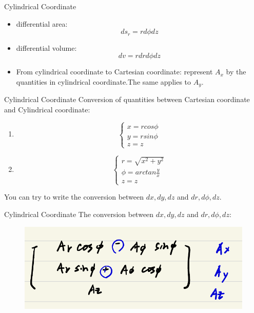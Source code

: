 \documentclass[xcolor={dvipsnames}]{beamer}
\begin{document}
\begin{frame}{Cylindrical Coordinate}
\begin{itemize}
    \item differential area: 
    $$
    ds_r = rd\phi dz
    $$

    \item differential volume:
    $$
    dv = rdrd\phi dz
    $$
    \item From cylindrical coordinate to Cartesian coordinate: represent $A_x$ by the quantities in cylindrical coordinate.The same applies to $A_y$.

\end{itemize}
\end{frame}
\begin{frame}{Cylindrical Coordinate}
Conversion of quantities between Cartesian coordinate and Cylindrical coordinate:
    \begin{enumerate}
   
        \item
        $$
        \begin{cases}
            x = rcos\phi\\
            y = rsin\phi\\
            z = z
        \end{cases}
        $$
        \item
        $$
        \begin{cases}
            r= \sqrt{x^2 + y^2}\\
            \phi = arctan \frac{y}{x}\\
            z = z
        \end{cases}
        $$
    \end{enumerate}
You can try to write the conversion between $dx,dy,dz$ and $dr,d\phi,dz$.
\end{frame}
\begin{frame}{Cylindrical Coordinate}
The conversion between $dx,dy,dz$ and $dr,d\phi,dz$:
\begin{figure}
	\centering
	\includegraphics[width=0.7\linewidth]{1.png}
\end{figure}
\end{frame}
\end{document}
